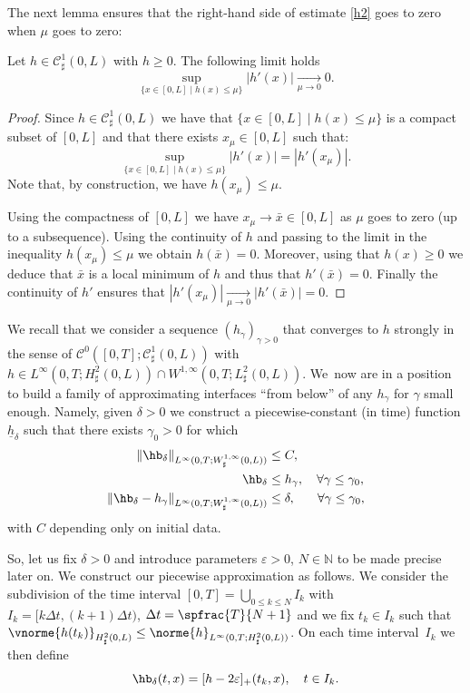 The next lemma ensures that the right-hand side of estimate \eqref{h2} goes to zero when $\mu$ goes to zero:
\begin{lemma}\label{lemma.conv.zero}Let $h \in \mathcal{C}_\sharp^{1}(0,L)$ with $h\geq 0$. The following limit holds
\[\sup_{\{x\in [0, L]\mid h(x)\leq\mu\}}\vert h'(x)\vert \underset{\mu\to 0}{\to} 0.
\]
\end{lemma}
\begin{proof}Since $ h \in \mathcal{C}^1_\sharp(0,L)$ we have that $\{ x \in [0,L]\mid h(x)\leq\mu\}$ is a compact subset of $[0,L]$ and that there exists $x_{\mu}\in [0,L]$ such that:
\[
\sup_{\{x\in [0, L]\mid h(x)\leq\mu\}} |h'(x)|= |h'(x_{\mu})|.
\]
Note that, by construction, we have $h(x_{\mu})\leq \mu$.

Using the compactness of $[0,L]$ we have $x_{\mu}\to \bar x\in [0,L]$ as $\mu$ goes to zero (up to a subsequence). Using the continuity of $h$ and passing to the limit in the inequality $h(x_{\mu})\leq \mu$ we obtain $h(\bar x)=0$. Moreover, using that $h(x)\geq 0$ we deduce that $\bar x$ is a local minimum of $h$ and thus that $h'(\bar x)=0$. Finally the continuity of $h'$ ensures that $|h'(x_{\mu})|\underset{\mu\to 0}{\to}|h'(\bar x)|=0$.
\end{proof}

We recall that we consider a sequence $(h_{\gamma})_{\gamma >0}$
that converges to $h$ strongly in the sense of $\mathcal{C}^{0}([0,T];\mathcal{C}_\sharp^{1}(0,L))$ with $h\in L^{\infty}(0,T;H_\sharp^{2}(0,L)) \cap W^{1,\infty}(0, T; L^2_\sharp(0, L))$.
We~now are in a position to build a family of approximating interfaces ``from below'' of any $h_\gamma$ for $\gamma$ small enough. Namely, given $\delta >0$ we construct a piecewise-constant (in time) function $\underline{h}_{\delta}$
such that there exists $\gamma_0 >0$ for which
\begin{align}
\|\hb_{\delta}\|_{L^{\infty}(0,T;W^{1,\infty}_{\sharp}(0,L))} &\leq C, \label{estimate.hb}\\
\hb_{\delta}&\leq h_{\gamma}, \quad\forall \gamma\leq\gamma_{0}, \label{eq.interfacebelow}\\
\| \hb_{\delta}- h_\gamma\|_{L^\infty(0,T; W_\sharp^{1, \infty}(0, L))}&\leq \delta, \;\;\,\quad\forall \gamma\leq\gamma_{0}, \label{estimation-diffth}
\end{align}
with $C$ depending only on initial data.

So, let us fix $\delta >0$ and introduce parameters $\varepsilon >0$, $N\in \mathbb N$ to be made precise later on.
We construct our piecewise approximation as follows. We consider the subdivision of the time interval $[0,T]=\bigcup_{0\leq k\leq N}I_{k}$ with $I_{k}=[k\Delta t,(k+1)\Delta t)$, $\Delta t=\spfrac{T}{N+1}$ and we fix $t_{k}\in I_{k}$ such that $\vnorme{h(t_{k})}_{H^{2}_{\sharp}(0,L)}\leq \norme{h}_{L^{\infty}(0,T;H^{2}_{\sharp}(0,L))}$. On each time interval~$I_k$ we then define
\begin{equation}
\label{def-sous-h}
\hb_{\delta}(t, x)= [h-2\varepsilon]_+(t_{k},x), \quad t\in I_k.
\end{equation}

